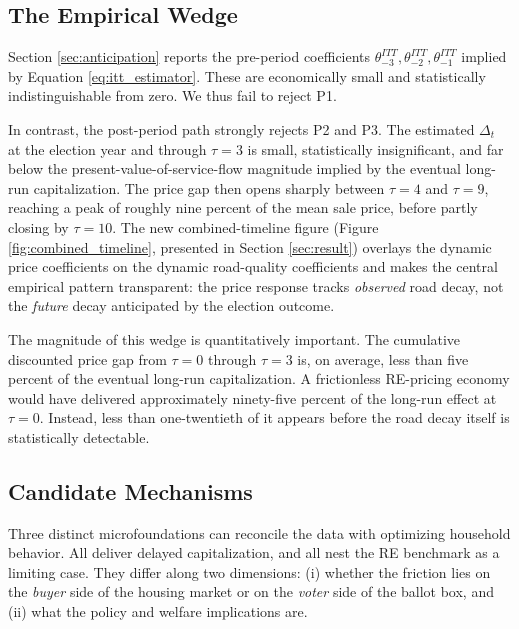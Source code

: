 \subsection{The Empirical Wedge}

Section \ref{sec:anticipation} reports the pre-period coefficients $\theta^{ITT}_{-3}, \theta^{ITT}_{-2}, \theta^{ITT}_{-1}$ implied by Equation \ref{eq:itt_estimator}. These are economically small and statistically indistinguishable from zero. We thus fail to reject P1.

In contrast, the post-period path strongly rejects P2 and P3. The estimated $\Delta_{t}$ at the election year and through $\tau = 3$ is small, statistically insignificant, and far below the present-value-of-service-flow magnitude implied by the eventual long-run capitalization. The price gap then opens sharply between $\tau = 4$ and $\tau = 9$, reaching a peak of roughly nine percent of the mean sale price, before partly closing by $\tau = 10$. The new combined-timeline figure (Figure \ref{fig:combined_timeline}, presented in Section \ref{sec:result}) overlays the dynamic price coefficients on the dynamic road-quality coefficients and makes the central empirical pattern transparent: the price response tracks {\it observed} road decay, not the {\it future} decay anticipated by the election outcome.

The magnitude of this wedge is quantitatively important. The cumulative discounted price gap from $\tau = 0$ through $\tau = 3$ is, on average, less than five percent of the eventual long-run capitalization. A frictionless RE-pricing economy would have delivered approximately ninety-five percent of the long-run effect at $\tau = 0$. Instead, less than one-twentieth of it appears before the road decay itself is statistically detectable. 

\subsection{Candidate Mechanisms}

Three distinct microfoundations can reconcile the data with optimizing household behavior. All deliver delayed capitalization, and all nest the RE benchmark as a limiting case. They differ along two dimensions: (i) whether the friction lies on the {\it buyer} side of the housing market or on the {\it voter} side of the ballot box, and (ii) what the policy and welfare implications are.

